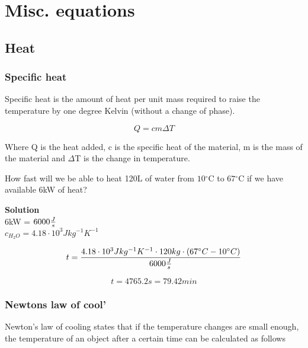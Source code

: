 \documentclass[11pt,fleqn,openany]{book} %
\newcommand{\degree}{\ensuremath{^\circ}}
\begin{document}

\chapter{Misc. equations}

\section{Heat}



\subsection{Specific heat}

Specific heat is the amount of heat per unit mass required to raise the temperature by one degree Kelvin (without a change of phase).

\begin{equation}
Q = c m \Delta T
\end{equation}

Where Q is the heat added, c is the specific heat of the material, m is the mass of the material and $\Delta$T is the change in temperature.

\begin{exercise}
How fast will we be able to heat 120L of water from $10\degree$C to $67\degree$C if we have available 6kW of heat?

\textbf{Solution}\\
6kW = $6000 {J \over s}$\\
$c_{H_2 O} = 4.18 \cdot 10^3 J kg^{-1} K^{-1} $

\begin{equation*}
t = {{4.18 \cdot 10^3 J kg^{-1} K^{-1} \cdot 120kg \cdot (67\degree C -10\degree C) } \over {6000 {J \over s}}}
\end{equation*}

\begin{equation*}
t = 4765.2 s = 79.42 min
\end{equation*}

\end{exercise}

\subsection{Newtons law of cool'}

Newton's law of cooling states that if the temperature changes are small enough, the temperature of an object after a certain time can be calculated as follows
\end{document}
